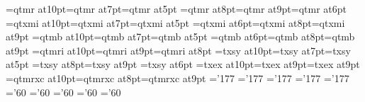 \ifx\PT\undefined{}\fi%
\font\tenrm=qtmr at10\PT \font\sevenrm=qtmr at7\PT \font\fiverm=qtmr at5\PT
\font\eightrm=qtmr at8\PT \font\ninerm=qtmr at9\PT \font\sixrm=qtmr at6\PT
\font\teni=qtxmi at10\PT \font\seveni=qtxmi at7\PT \font\fivei=qtxmi at5\PT
\font\sixi=qtxmi at6\PT  \font\eighti=qtxmi at8\PT \font\ninei=qtxmi at9\PT
\font\tenbf=qtmb at10\PT \font\sevenbf=qtmb at7\PT \font\fivebf=qtmb at5\PT
\font\sixbf=qtmb at6\PT  \font\eightbf=qtmb at8\PT \font\ninebf=qtmb at9\PT
\font\tenit=qtmri at10\PT \font\nineit=qtmri at9\PT \font\eightit=qtmri at8\PT
\font\tensy=txsy at10\PT \font\sevensy=txsy at7\PT \font\fivesy=txsy at5\PT
\font\eightsy=txsy at8\PT \font\ninesy=txsy at9\PT
\font\sixsy=txsy at6\PT
\font\tenex=txex at10\PT \font\eightex=txex at9\PT \font\nineex=txex at9\PT
\font\tencsc=qtmrxc at10\PT \font\eightcsc=qtmrxc at8\PT \font\ninecsc=qtmrxc at9\PT
%
\skewchar\teni='177 \skewchar\ninei='177 \skewchar\eighti='177
\skewchar\seveni='177 \skewchar\fivei='177
\skewchar\tensy='60 \skewchar\ninesy='60 \skewchar\eightsy='60
\skewchar\sevensy='60 \skewchar\fivesy='60
%
\def\eightpoint{\def\rm{\fam0\eightrm}%
\textfont0\eightrm \scriptfont0=\sixrm \scriptscriptfont0=\fiverm
\textfont1\eighti  \scriptfont1=\sixi  \scriptscriptfont1=\fivei
\textfont2\eightsy \scriptfont2=\sixsy   \scriptscriptfont2=\fivesy
\textfont3\eightex \scriptfont3=\eightex \scriptscriptfont3=\eightex
\def\mit{\fam1}\def\oldstyle{\fam1\eighti}\def\cal{\fam2}%
\textfont\itfam=\eightit \def\it{\fam\itfam\eightit}%
\textfont\bffam=\eightbf \scriptfont\bffam=\sixbf\scriptscriptfont\bffam=\fivebf
\def\bf{\fam\bffam\eightbf}%
\let\sc=\eightcsc
\normalbaselineskip=10\PT
\setbox\strutbox=\hbox{\vrule height7.6\PT depth 2.4\PT width0pt}%
\normalbaselines\rm}
\def\ninepoint{\def\rm{\fam0\ninerm}%
\textfont0=\ninerm \scriptfont0=\sixrm \scriptscriptfont0=\fiverm
\textfont1=\ninei  \scriptfont1=\sixi  \scriptscriptfont1=\fivei
\textfont2=\ninesy \scriptfont2=\sixsy  \scriptscriptfont2=\fivesy
\textfont3=\nineex \scriptfont3=\nineex \scriptscriptfont3=\nineex
\def\mit{\fam1}\def\oldstyle{\fam1\ninei}\def\cal{\fam2}%
\textfont\itfam=\nineit \def\it{\fam\itfam\nineit}%
\textfont\bffam=\ninebf \scriptfont\bffam=\sixbf \scriptscriptfont\bffam=\fivebf
\def\bf{\fam\bffam\ninebf}%
\let\sc=\ninecsc
\normalbaselineskip=11\PT
\setbox\strutbox=\hbox{\vrule height8\PT depth3\PT width0\PT}%
\normalbaselines\rm}
